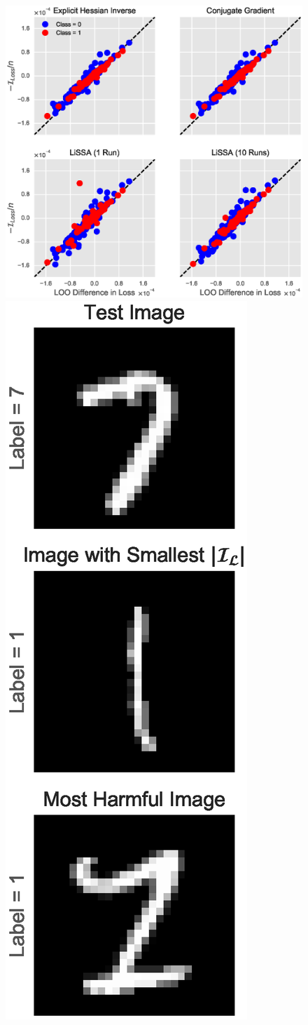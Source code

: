 \documentclass{article}
\begin{document}
\begin{figure}[ht]
\vskip 0.0in
\begin{center}
\centerline{\includegraphics[width=1\columnwidth]{fig-logit}
\includegraphics[width=0.35\columnwidth]{fig-logit-img}}

\end{center}
\end{figure}
\end{document}
